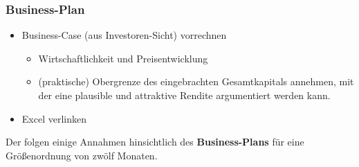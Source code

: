 
\vspace{0.5cm}


\subsubsection{Business-Plan}
\vspace{0.2cm}


\begin{itemize} 
	\item Business-Case (aus Investoren-Sicht) vorrechnen
	\begin{itemize}
		\item Wirtschaftlichkeit und Preisentwicklung
		\item (praktische) Obergrenze des eingebrachten Gesamtkapitals annehmen, mit der eine plausible und attraktive Rendite argumentiert werden kann.
	\end{itemize}
	\item Excel verlinken
\end{itemize}

\vspace{0.6cm}

Der  folgen einige Annahmen hinsichtlich des \textbf{Business-Plans} für eine Größenordnung von zwölf Monaten.

\vspace{0.3cm}

